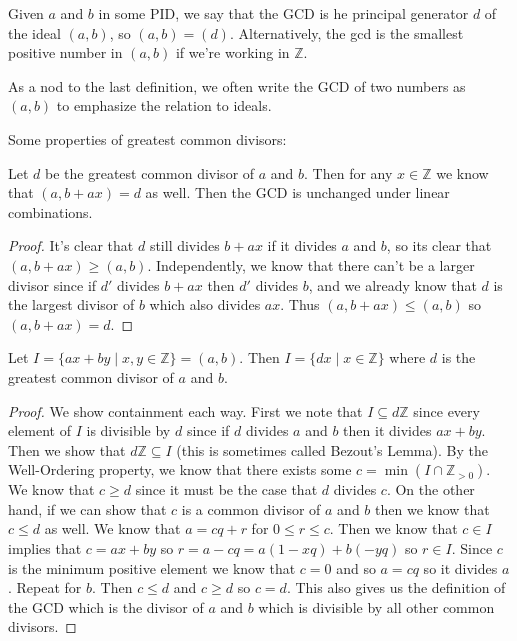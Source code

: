 \begin{definition}[GCD]
Given $a$ and $b$ in some PID, we say that the GCD is he principal generator $d$ of the ideal $(a,b)$, so $(a,b) = (d)$. Alternatively, the gcd is the smallest positive number in $(a,b)$ if we're working in $\mathbb{Z}$.
\end{definition}

\begin{notation}[GCD]
As a nod to the last definition, we often write the GCD of two numbers as $(a,b)$ to emphasize the relation to ideals.
\end{notation}

Some properties of greatest common divisors:

\begin{lemma}
Let $d$ be the greatest common divisor of $a$ and $b$. Then for any $x \in \mathbb{Z}$ we know that $(a, b+ax) = d$ as well. Then the GCD is unchanged under linear combinations.
\end{lemma}

\begin{proof}
It's clear that $d$ still divides $b+ax$ if it divides $a$ and $b$, so its clear that $(a,b+ax) \geq (a,b)$. Independently, we know that there can't be a larger divisor since if $d'$ divides $b + ax$ then $d'$ divides $b$, and we already know that $d$ is the largest divisor of $b$ which also divides $ax$. Thus $(a,b+ax) \leq (a,b)$ so $(a,b+ax) = d$.
\end{proof}

\begin{lemma}
Let $I = \{ax+by \mid x,y \in \mathbb{Z}\} = (a,b)$. Then $I = \{dx \mid x \in \mathbb{Z}\}$ where $d$ is the greatest common divisor of $a$ and $b$.
\end{lemma}

\begin{proof}
We show containment each way. First we note that $I \subseteq d\mathbb{Z}$ since every element of $I$ is divisible by $d$ since if $d$ divides $a$ and $b$ then it divides $ax+by$. Then we show that $d\mathbb{Z} \subseteq I$ (this is sometimes called Bezout's Lemma).  By the Well-Ordering property, we know that there exists some $c = \min(I \cap \mathbb{Z}_{>0})$. We know that $c \geq d$ since it must be the case that $d$ divides $c$. On the other hand, if we can show that $c$ is a common divisor of $a$ and $b$ then we know that $c \leq d$ as well. We know that $a = cq + r$ for $0 \leq r \leq c$. Then we know that $c \in I$ implies that $c = ax + by$ so $r = a-cq = a(1-xq) + b(-yq)$ so $r \in I$. Since $c$ is the minimum positive element we know that $c = 0$ and so $a = cq$ so it divides $a$. Repeat for $b$. Then $c \leq d$ and $c \geq d$ so $c=d$. This also gives us the definition of the GCD which is the divisor of $a$ and $b$ which is divisible by all other common divisors.
\end{proof}

